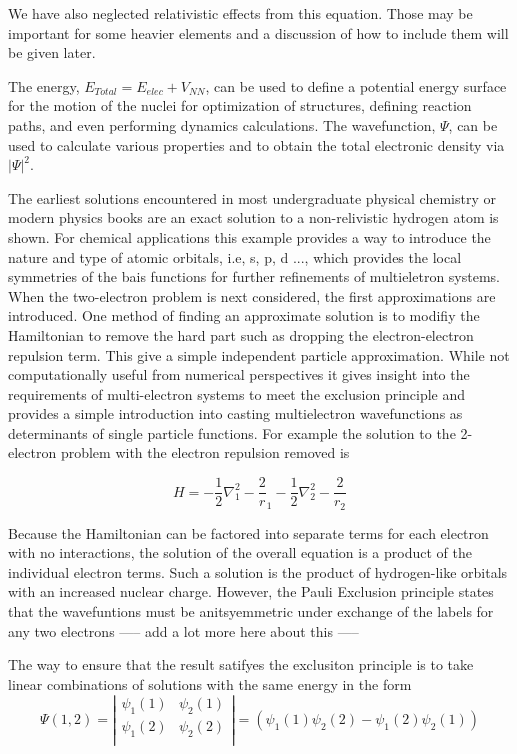 We have also neglected relativistic effects from this equation.  Those may be important for some heavier elements and a discussion of how to include them will be given later.


The energy, $E_{Total} = E_{elec} + V_{NN}$, can be used to define a potential energy surface for the motion of the nuclei for optimization of structures, defining reaction paths, and even performing dynamics calculations.  The wavefunction, $\Psi$, can be used to calculate various properties and to obtain the total electronic density via $\left|\Psi\right|^2$.

The earliest solutions encountered in most undergraduate physical chemistry or modern physics books are an exact solution to a non-relivistic hydrogen atom is shown.  For chemical applications this example provides a way to introduce the nature and type of atomic orbitals, i.e, s, p, d ..., which provides the local symmetries of the bais functions for further refinements of multieletron systems.  When the two-electron problem is next considered, the first approximations are introduced.  One method of finding an approximate solution is to modifiy the Hamiltonian to remove the hard part such as dropping the electron-electron repulsion term.  This give a simple independent particle approximation.  While not computationally useful from numerical perspectives it gives insight into the requirements of multi-electron systems to meet the exclusion principle and provides a simple introduction into casting multielectron wavefunctions as determinants of single particle functions.  
  For example the solution to the 2-electron problem with the electron repulsion removed is
  
\begin{equation}
H = -\frac{1}{2}\nabla^2_1 -  \frac{2}r_1 -\frac{1}{2}\nabla^2_2 - \frac{2}{r_2}
\end{equation}
  
Because the Hamiltonian can be factored into separate terms for each electron with no interactions, the solution of the overall equation is a product of the individual electron terms.  Such a solution is the product of hydrogen-like orbitals with an increased nuclear charge.
However, the Pauli Exclusion principle states that the wavefuntions must be anitsyemmetric under exchange of the labels for any two electrons ----- add a lot more here about this -----

The way to ensure that the result satifyes the exclusiton principle is to take linear combinations of solutions with the same energy in the form
\begin{equation} 
\Psi(1,2) = \left|
\begin{array}{cc}
	\psi_1(1) & \psi_2(1) \\
	\psi_1(2) & \psi_2(2) \\
	\end{array} \right|
	= \left(\psi_1(1)\psi_2(2) - \psi_1(2)\psi_2(1)\right)
\end{equation}
  
